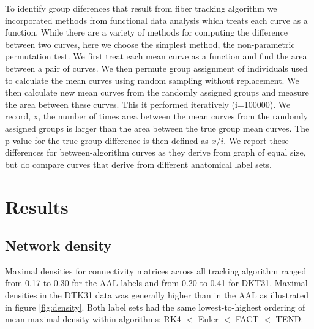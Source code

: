 \documentclass{frontiersSCNS} %
\begin{document}
To identify group diferences that result from fiber tracking algorithm we incorporated methods from functional data analysis which treats each curve as a function. While there are a variety of methods for computing the difference between two curves, here we choose the simplest method, the non-parametric permutation test. We first treat each mean curve as a function and find the area between a pair of curves. We then permute group assignment of individuals used to calculate the mean curves using random sampling without replacement. We then calculate new mean curves from the randomly assigned groups and measure the area between these curves. This it performed iteratively (i=100000). We record, x, the number of times area between the mean curves from the randomly assigned groups is larger than the area between the true group mean curves. The p-value for the true group difference is then defined as $x/i$. We report these differences for between-algorithm curves as they derive from graph of equal size, but do compare curves that derive from different anatomical label sets.



\section{Results}
\subsection{Network density}
Maximal densities for connectivity matrices across all tracking algorithm ranged from 0.17 to 0.30 for the AAL labels and from 0.20 to 0.41 for DKT31. Maximal densities in the DTK31 data was generally higher than in the AAL as illustrated in figure \ref{fig:density}. Both label sets had the same lowest-to-highest ordering of mean maximal density within algorithms: RK4 $<$ Euler $<$ FACT $<$ TEND.
\end{document}

